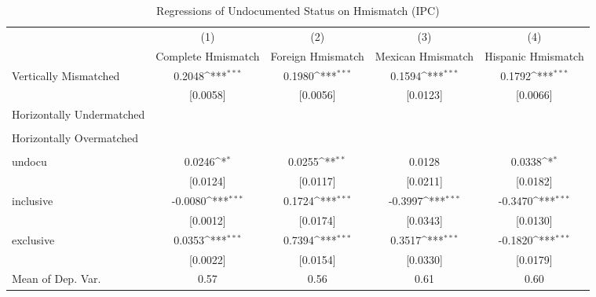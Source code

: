 \begin{table}[htbp]\centering
\def\sym#1{\ifmmode^{#1}\else\(^{#1}\)\fi}
\caption{Regressions of Undocumented Status on Hmismatch (IPC)}
\begin{tabular}{l*{4}{c}}
\toprule
                    &\multicolumn{1}{c}{(1)}         &\multicolumn{1}{c}{(2)}         &\multicolumn{1}{c}{(3)}         &\multicolumn{1}{c}{(4)}         \\
                    &Complete Hmismatch         &Foreign Hmismatch         &Mexican Hmismatch         &Hispanic Hmismatch         \\
\midrule
Vertically Mismatched&      0.2048\sym{***}&      0.1980\sym{***}&      0.1594\sym{***}&      0.1792\sym{***}\\
                    &    [0.0058]         &    [0.0056]         &    [0.0123]         &    [0.0066]         \\
\addlinespace
Horizontally Undermatched&                     &                     &                     &                     \\
                    &                     &                     &                     &                     \\
\addlinespace
Horizontally Overmatched&                     &                     &                     &                     \\
                    &                     &                     &                     &                     \\
\addlinespace
undocu              &      0.0246\sym{*}  &      0.0255\sym{**} &      0.0128         &      0.0338\sym{*}  \\
                    &    [0.0124]         &    [0.0117]         &    [0.0211]         &    [0.0182]         \\
\addlinespace
inclusive           &     -0.0080\sym{***}&      0.1724\sym{***}&     -0.3997\sym{***}&     -0.3470\sym{***}\\
                    &    [0.0012]         &    [0.0174]         &    [0.0343]         &    [0.0130]         \\
\addlinespace
exclusive           &      0.0353\sym{***}&      0.7394\sym{***}&      0.3517\sym{***}&     -0.1820\sym{***}\\
                    &    [0.0022]         &    [0.0154]         &    [0.0330]         &    [0.0179]         \\
\midrule
Mean of Dep. Var.   &        0.57         &        0.56         &        0.61         &        0.60         \\

\end{tabular}
\end{table}
